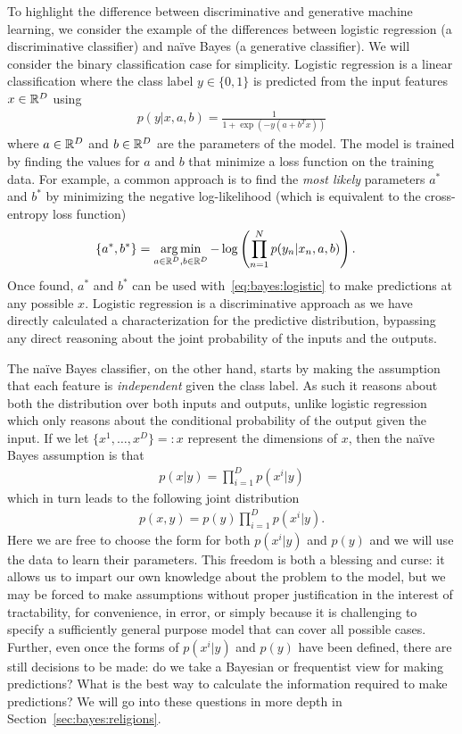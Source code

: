 To highlight the difference between discriminative and generative machine learning, we consider the
example of the differences between logistic regression (a discriminative classifier) and na\"{i}ve Bayes 
(a generative classifier).  We will consider the binary classification case for simplicity.  Logistic regression is a linear
classification where the class label $y \in \{0,1\}$ is predicted from the input features $x \in \mathbb{R}^D$ using
\begin{align}
\label{eq:bayes:logistic}
p(y|x,a,b) = \frac{1}{1+\exp(-y(a+b^Tx))}
\end{align}
where $a \in \mathbb{R}^D$ and $b \in \mathbb{R}^D$ are the parameters of the model.  The model is trained by finding the values
for $a$ and $b$ that minimize a loss function on the training data.  For example, a common approach
is to find the \emph{most likely} parameters $a^*$ and $b^*$ by minimizing the negative log-likelihood
(which is equivalent to the cross-entropy loss function)
\begin{align}
\{a^*,b^*\} &= \operatorname*{arg\,min}_{a\in \mathbb{R}^D,b\in \mathbb{R}^D} -\log \left(\prod_{n=1}^{N} p(y_n|x_n,a,b)\right).
\end{align}
Once found, $a^*$ and $b^*$ can be used with~\eqref{eq:bayes:logistic} to make predictions at
any possible $x$.  Logistic regression is a discriminative approach as we have directly calculated
a characterization for the predictive distribution, bypassing any direct reasoning about the joint
probability of the inputs and the outputs.

The na\"{i}ve Bayes classifier, on the other hand, starts by making the assumption that each feature
is \emph{independent} given the class label.  As such it reasons about both the distribution over both
inputs and outputs, unlike logistic regression which only reasons about the conditional probability
of the output given the input.   If we let $\{x^1,\dots,x^D\} =: x$ represent the dimensions of $x$, then
the na\"{i}ve Bayes assumption is that
\begin{align}
p(x|y) = \prod_{i=1}^D p(x^i |y)
\end{align}
which in turn leads to the following joint distribution
\begin{align}
p(x,y) = p(y) \prod_{i=1}^D p(x^i |y).
\end{align}
Here we are free to choose the form for both $p(x^i |y)$ and $p(y)$ %
and we will use the data to learn their parameters.
This freedom is both a blessing and curse: it allows us to impart our own knowledge about the problem to
the model, but we may be forced to make assumptions without proper justification in the interest
of tractability, for convenience, in error, or simply because it is challenging to specify a sufficiently
general purpose model that can cover all possible cases.
Further, even once the forms of $p(x^i |y)$ and $p(y)$ have been defined, there are still decisions to be
made: do we take a Bayesian or frequentist view for making predictions? What is the best way
to calculate the information required to make predictions?  We will go into these questions in
more depth in Section~\ref{sec:bayes:religions}.

